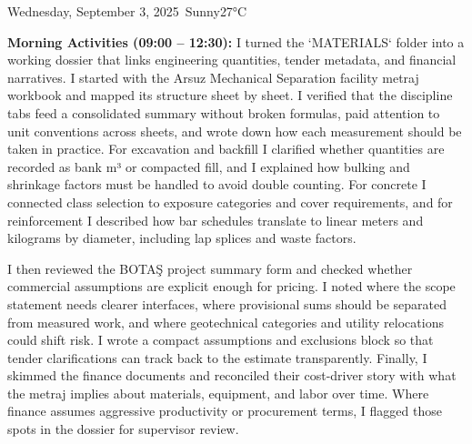 \begin{dailyentry}{Wednesday, September 3, 2025}{\weathersunny\ Sunny}{27°C}

\begin{workcontent}
\textbf{Morning Activities (09:00 – 12:30):} I turned the `MATERIALS` folder into a working dossier that links engineering quantities, tender metadata, and financial narratives. I started with the Arsuz Mechanical Separation facility metraj workbook and mapped its structure sheet by sheet. I verified that the discipline tabs feed a consolidated summary without broken formulas, paid attention to unit conventions across sheets, and wrote down how each measurement should be taken in practice. For excavation and backfill I clarified whether quantities are recorded as bank m³ or compacted fill, and I explained how bulking and shrinkage factors must be handled to avoid double counting. For concrete I connected class selection to exposure categories and cover requirements, and for reinforcement I described how bar schedules translate to linear meters and kilograms by diameter, including lap splices and waste factors.

I then reviewed the BOTAŞ project summary form and checked whether commercial assumptions are explicit enough for pricing. I noted where the scope statement needs clearer interfaces, where provisional sums should be separated from measured work, and where geotechnical categories and utility relocations could shift risk. I wrote a compact assumptions and exclusions block so that tender clarifications can track back to the estimate transparently. Finally, I skimmed the finance documents and reconciled their cost-driver story with what the metraj implies about materials, equipment, and labor over time. Where finance assumes aggressive productivity or procurement terms, I flagged those spots in the dossier for supervisor review.

\begin{table}[ht]
\centering
\small
\caption{Materials Dossier Index and Intended Use}
\end{table}


\end{workcontent}
\end{dailyentry}
